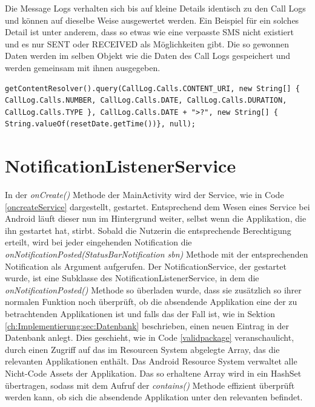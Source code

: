Die Message Logs verhalten sich bis auf kleine Details identisch zu den Call Logs und können auf dieselbe Weise ausgewertet werden.
Ein Beispiel für ein solches Detail ist unter anderem, dass so etwas wie eine verpasste SMS nicht existiert und es nur SENT oder RECEIVED als Möglichkeiten gibt.
Die so gewonnen Daten werden im selben Objekt wie die Daten des Call Logs gespeichert und werden gemeinsam mit ihnen ausgegeben.

\begin{lstlisting}[frame=single, caption = Call Log Query, label=calllogquery] 
  getContentResolver().query(CallLog.Calls.CONTENT_URI, new String[] { CallLog.Calls.NUMBER, CallLog.Calls.DATE, CallLog.Calls.DURATION, CallLog.Calls.TYPE }, CallLog.Calls.DATE + ">?", new String[] { String.valueOf(resetDate.getTime())}, null);
\end{lstlisting}

\section{NotificationListenerService}

In der \emph{onCreate()} Methode der MainActivity wird der Service, wie in Code \ref{oncreateService} dargestellt, gestartet.
Entsprechend dem Wesen eines Service bei Android läuft dieser nun im Hintergrund weiter, selbst wenn die Applikation, die ihn gestartet hat, stirbt.
Sobald die Nutzerin die entsprechende Berechtigung erteilt, wird bei jeder eingehenden Notification die \emph{onNotificationPosted(StatusBarNotification sbn)} Methode mit der entsprechenden Notification als Argument aufgerufen.
Der NotificationService, der gestartet wurde, ist eine Subklasse des NotificationListenerService, in dem die  \emph{onNotificationPosted()} Methode so überladen wurde,
dass sie zusätzlich so ihrer normalen Funktion noch überprüft, ob die absendende Applikation eine der zu betrachtenden Applikationen ist und falls das der Fall ist, wie in Sektion \ref{ch:Implementierung:sec:Datenbank} beschrieben, einen neuen Eintrag in der Datenbank anlegt.
Dies geschieht, wie in Code \ref{validpackage} veranschaulicht, durch einen Zugriff auf das im Resourcen System abgelegte Array, das die relevanten Applikationen enthält. 
Das Android Resource System verwaltet alle Nicht-Code Assets der Applikation.
Das so erhaltene Array wird in ein HashSet übertragen, sodass mit dem Aufruf der \emph{contains()} Methode effizient überprüft werden kann, ob sich die absendende Applikation unter den relevanten befindet.


